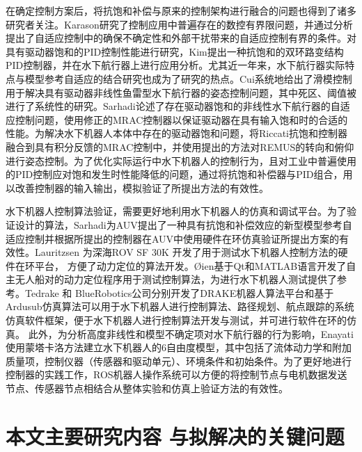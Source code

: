 在确定控制方案后，将抗饱和补偿与原来的控制架构进行融合的问题也得到了诸多研究者关注\cite{oliveira2013design,sofrony2007anti,Chen2009Neural}。Karason研究了控制应用中普遍存在的数控有界限问题，并通过分析提出了自适应控制中的确保不确定性和外部干扰带来的自适应控制有界的条件\cite{karason1993adaptive}。对具有驱动器饱和的PID控制性能进行研究，Kim提出一种抗饱和的双环路变结构PID控制器，并在水下航行器上进行应用分析\cite{kim2013variable}。尤其近一年来，水下航行器实际特点与模型参考自适应的结合研究也成为了研究的热点。Cui系统地给出了滑模控制用于解决具有驱动器非线性鱼雷型水下航行器的姿态控制问题，其中死区、阈值被进行了系统性的研究\cite{cui2016adaptive}。Sarhadi论述了存在驱动器饱和的非线性水下航行器的自适应控制问题，使用修正的MRAC控制器以保证驱动器在具有输入饱和时的合适的性能\cite{sarhadi2016adaptive1}。为解决水下机器人本体中存在的驱动器饱和问题，将Riccati抗饱和控制器融合到具有积分反馈的MRAC控制中，并使用提出的方法对REMUS的转向和俯仰进行姿态控制\cite{sarhadi2016adaptive2}。为了优化实际运行中水下机器人的控制行为，且对工业中普遍使用的PID控制应对饱和发生时性能降低的问题，通过将抗饱和补偿器与PID组合，用以改善控制器的输入输出，模拟验证了所提出方法的有效性\cite{sarhadi2016model1}。

水下机器人控制算法验证，需要更好地利用水下机器人的仿真和调试平台。为了验证设计的算法，Sarhadi为AUV提出了一种具有抗饱和补偿效应的新型模型参考自适应控制并根据所提出的控制器在AUV中使用硬件在环仿真验证所提出方案的有效性\cite{sarhadi2015state,sarhadi2017model2,hsu2000dynamic}。Lauritzsen 为深海ROV SF 30K 开发了用于测试水下机器人控制方法的硬件在环平台， 方便了动力定位的算法开发\cite{lauritzsen2014hardware,smallwood2004model}。{\O}ien基于Qt和MATLAB语言开发了自主无人船对的动力定位程序用于测试控制算法，为进行水下机器人测试提供了参考\cite{oien2016dynamic}。Tedrake 和 BlueRobotics公司分别开发了DRAKE机器人算法平台和基于Ardusub仿真算法可以用于水下机器人进行控制算法、路径规划、航点跟踪的系统仿真软件框架，便于水下机器人进行控制算法开发与测试，并可进行软件在环的仿真\cite{drake2016,ardusub,ardupilot,arnesen20173d,rohmer2013vrep,tedrake2009lqr,tedrake2010lqr}。 此外，为分析高度非线性和模型不确定项对水下航行器的行为影响，Enayati使用蒙塔卡洛方法建立水下机器人的6自由度模型，其中包括了流体动力学和附加质量项，控制仪器（传感器和驱动单元）、环境条件和初始条件\cite{enayati2016monte}。为了更好地进行控制器的实践工作，ROS机器人操作系统可以方便的将控制节点与电机数据发送节点、传感器节点相结合从整体实验和仿真上验证方法的有效性\cite{dhurandher2008uwsim,xu2005simulation}。


\section{本文主要研究内容 与拟解决的关键问题 }

